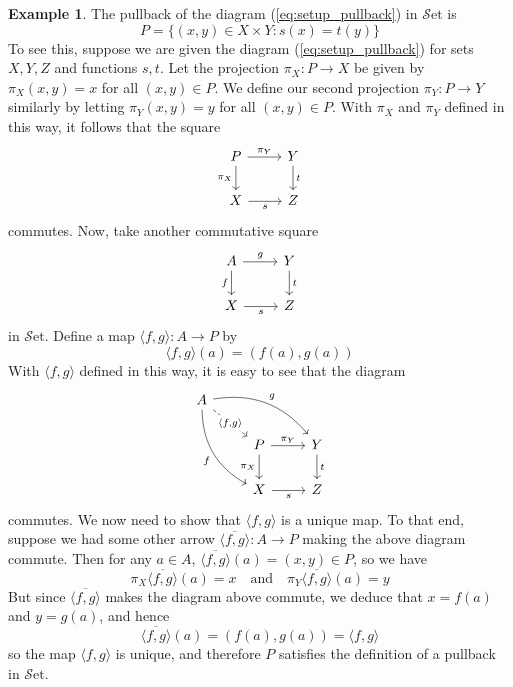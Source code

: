 \documentclass[10pt,oneside]{book}
\def\~#1{\mathscr{#1}}
\newcommand{\Set}{\~S\mathrm{et}}
\theoremstyle{plain}
\theoremstyle{definition}
\newtheorem{ex}[thm]{Example}
\theoremstyle{remark}
\numberwithin{equation}{section}
\numberwithin{figure}{section}
\begin{document}
\begin{ex}
    The pullback of the diagram (\ref{eq:setup_pullback}) in $\Set$ is 
    \[P = \{(x, y) \in X \times Y : s(x) = t(y)\}\]
    To see this, suppose we are given the diagram (\ref{eq:setup_pullback}) for sets $X, Y, Z$ and functions $s, t$. Let the projection $\pi_X: P \to X$ be given by $\pi_X(x, y) = x$ for all $(x, y) \in P$. We define our second projection $\pi_Y: P \to Y$ similarly by letting $\pi_Y(x, y) = y$ for all $(x, y) \in P$. With $\pi_X$ and $\pi_Y$ defined in this way, it follows that the square
    \[
        \begin{tikzcd}
           P & Y \\
           X & Z
           \arrow["t", from=1-2, to=2-2]
           \arrow["{\pi_X}"', from=1-1, to=2-1]
           \arrow["s"', from=2-1, to=2-2]
           \arrow["{\pi_Y}", from=1-1, to=1-2]
        \end{tikzcd}
    \]
    commutes.
    Now, take another commutative square
    \[
        \begin{tikzcd}
        A & Y \\
        X & Z
        \arrow["{g}", from=1-1, to=1-2]
        \arrow["s"', from=2-1, to=2-2]
        \arrow["t", from=1-2, to=2-2]
        \arrow["{f}"', from=1-1, to=2-1]
        \end{tikzcd}
    \]
    in $\Set$. Define a map $\langle f, g \rangle : A \to P$ by 
    \[\langle f, g \rangle (a) = (f(a), g(a))\]
    With $\langle f, g \rangle $ defined in this way, it is easy to see that the diagram
    \[
        \begin{tikzcd}
            A \\
            & P & Y \\
            & X & Z
            \arrow["{\langle f, g \rangle}"{description}, dashed, from=1-1, to=2-2]
            \arrow["{\pi_X}"', from=2-2, to=3-2]
            \arrow["{\pi_Y}", from=2-2, to=2-3]
            \arrow["s"', from=3-2, to=3-3]
            \arrow["t", from=2-3, to=3-3]
            \arrow["{f}"', bend right, from=1-1, to=3-2]
            \arrow["{g}", bend left, from=1-1, to=2-3]
        \end{tikzcd}
    \]
    commutes. We now need to show that $\langle f, g \rangle $ is a unique map. To that end, suppose we had some other arrow $\overline{\langle f, g \rangle}: A \to P$ making the above diagram commute. Then for any $a \in A$, $\overline{\langle f, g \rangle}(a) = (x, y) \in P$, so we have 
   \[ \pi_X \overline{\langle f, g \rangle}(a) = x \quad \text{and} \quad  \pi_Y \overline{\langle f, g \rangle}(a) = y\] 
    But since $\overline{\langle f, g \rangle}$ makes the diagram above commute, we deduce that $x = f(a)$ and $y = g(a)$, and hence
    \[\overline{\langle f, g \rangle} (a) = \left( f(a), g(a) \right) = \langle f, g \rangle\]
    so the map $\langle f, g \rangle$ is unique, and therefore $P$ satisfies the definition of a pullback in $\Set$.
\end{ex}
\end{document}
